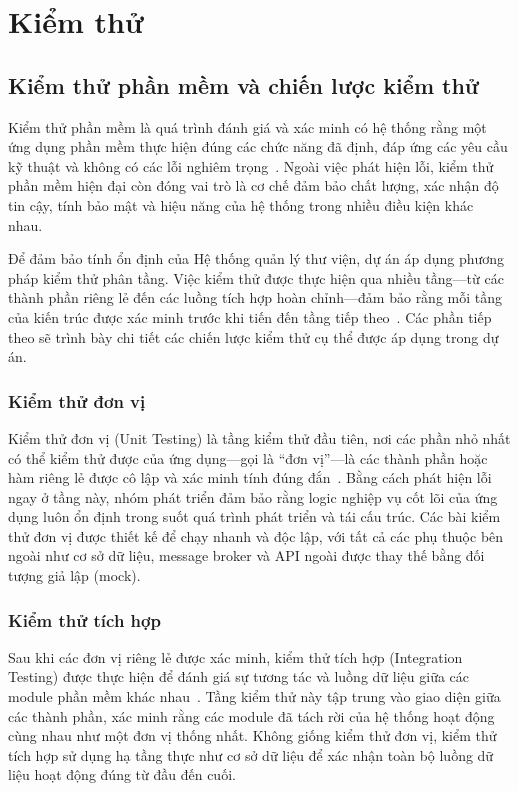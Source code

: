 \chapter{Kiểm thử}

\section{Kiểm thử phần mềm và chiến lược kiểm thử}

Kiểm thử phần mềm là quá trình đánh giá và xác minh có hệ thống rằng một ứng dụng
phần mềm thực hiện đúng các chức năng đã định, đáp ứng các yêu cầu kỹ thuật và
không có các lỗi nghiêm trọng~\cite{testing_definition}. Ngoài việc phát hiện lỗi,
kiểm thử phần mềm hiện đại còn đóng vai trò là cơ chế đảm bảo chất lượng, xác nhận
độ tin cậy, tính bảo mật và hiệu năng của hệ thống trong nhiều điều kiện khác nhau.

Để đảm bảo tính ổn định của Hệ thống quản lý thư viện, dự án áp dụng phương pháp
kiểm thử phân tầng. Việc kiểm thử được thực hiện qua nhiều tầng---từ các thành phần
riêng lẻ đến các luồng tích hợp hoàn chỉnh---đảm bảo rằng mỗi tầng của kiến trúc
được xác minh trước khi tiến đến tầng tiếp theo~\cite{test_pyramid}. Các phần tiếp
theo sẽ trình bày chi tiết các chiến lược kiểm thử cụ thể được áp dụng trong dự án.

\subsection{Kiểm thử đơn vị}

Kiểm thử đơn vị (Unit Testing) là tầng kiểm thử đầu tiên, nơi các phần nhỏ nhất
có thể kiểm thử được của ứng dụng---gọi là ``đơn vị''---là các thành phần hoặc hàm
riêng lẻ được cô lập và xác minh tính đúng đắn~\cite{unit_testing}. Bằng cách phát
hiện lỗi ngay ở tầng này, nhóm phát triển đảm bảo rằng logic nghiệp vụ cốt lõi của
ứng dụng luôn ổn định trong suốt quá trình phát triển và tái cấu trúc. Các bài kiểm
thử đơn vị được thiết kế để chạy nhanh và độc lập, với tất cả các phụ thuộc bên
ngoài như cơ sở dữ liệu, message broker và API ngoài được thay thế bằng đối tượng
giả lập (mock).

\subsection{Kiểm thử tích hợp}

Sau khi các đơn vị riêng lẻ được xác minh, kiểm thử tích hợp (Integration Testing)
được thực hiện để đánh giá sự tương tác và luồng dữ liệu giữa các module phần mềm
khác nhau~\cite{integration_testing}. Tầng kiểm thử này tập trung vào giao diện
giữa các thành phần, xác minh rằng các module đã tách rời của hệ thống hoạt động
cùng nhau như một đơn vị thống nhất. Không giống kiểm thử đơn vị, kiểm thử tích hợp
sử dụng hạ tầng thực như cơ sở dữ liệu để xác nhận toàn bộ luồng dữ liệu hoạt động
đúng từ đầu đến cuối.

